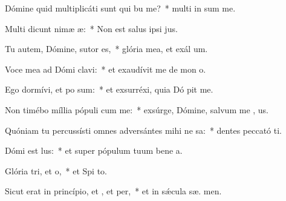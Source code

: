 \item Dómine quid multiplicáti sunt qui bu me?~* multi in sum me.
\item Multi dicunt nimæ æ:~* Non est salus ipsi   jus.
\item Tu autem, Dómine, sutor  es,~* glória mea, et exál  um.
\item Voce mea ad Dómi clavi:~* et exaudívit me de mon  o.
\item Ego dormívi, et po sum:~* et exsurréxi, quia Dó pit me.
\item Non timébo míllia pópuli cum me:~* exsúrge, Dómine, salvum me ,  us.
\item Quóniam tu percussísti omnes adversántes mihi ne sa:~* dentes peccató ti.
\item Dómi est lus:~* et super pópulum tuum bene a.
\item Glória tri, et o,~* et Spi to.
\item Sicut erat in princípio, et , et per,~* et in sǽcula sæ. men.
